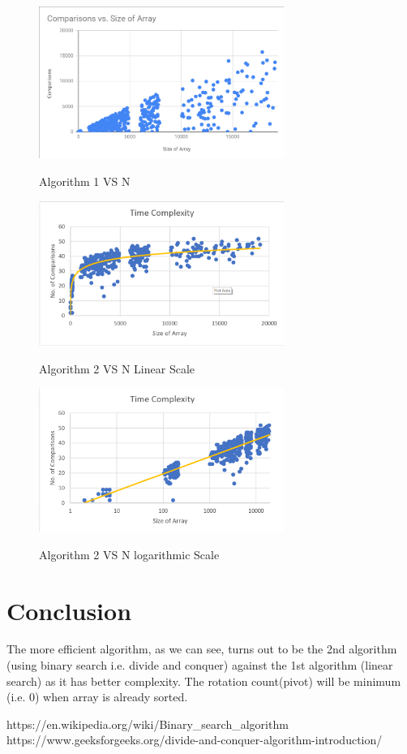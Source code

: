 \documentclass[conference]{IEEEtran}
\begin{document}
\begin{figure}[h!]
\centerline{\includegraphics[width=80mm]{tc_naive.png}}
\caption{Algorithm 1 VS N}
\centerline{\textit{ }}
\label{fig:graph}
\end{figure}

\begin{figure}[h!]
\centerline{\includegraphics[width=80mm]{tc_linear.png}}
\caption{Algorithm 2 VS N Linear Scale}
\centerline{\textit{ }}
\label{fig:graph}
\end{figure}

\begin{figure}[h!]
\centerline{\includegraphics[width=80mm]{tc_log.png}}
\caption{Algorithm 2 VS N logarithmic Scale}
\centerline{\textit{ }}
\label{fig:graph}
 \end{figure}
\newpage

\section{Conclusion}
The more efficient algorithm, as we can see, turns out to be the 2nd algorithm (using binary search i.e. divide and conquer) against the 1st algorithm (linear search) as it has better complexity. The rotation count(pivot) will be minimum (i.e. 0) when array is already sorted.

\begin{thebibliography}{00}
https://en.wikipedia.org/wiki/Binary\_search\_algorithm
https://www.geeksforgeeks.org/divide-and-conquer-algorithm-introduction/
\end{thebibliography}
\end{document}
